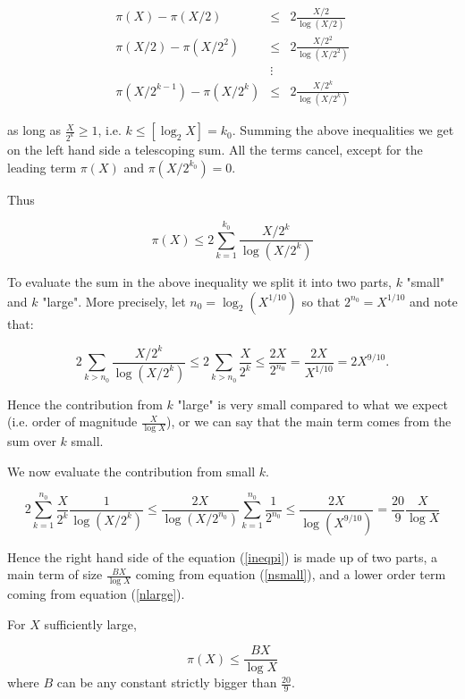 \documentclass[12pt,letterpaper]{report}
\newcommand\be{\begin{equation}}
\newcommand\ee{\end{equation}}
\newcommand\bea{\begin{eqnarray}}
\newcommand\eea{\end{eqnarray}}
\begin{document}
\bea \pi(X)-\pi(X/2) & \le & 2\frac{X/2}{\log (X/2)} \nonumber\\
\pi (X/2) - \pi(X/2^2) & \le & 2\frac{X/2^2}{\log (X/2^2)}
\nonumber\\  & \vdots & \nonumber\\  \pi(X/2^{k-1})-\pi(X/2^k) &
\le & 2\frac{X/2^k}{\log (X/2^k)} \eea

as long as $\frac{X}{2^k}\geq 1$, i.e. $k\leq [\log _2X]= k_0$.
Summing the above inequalities we get on the left hand side a
telescoping sum. All the terms cancel, except for the leading term
$\pi(X)$ and $\pi(X/2^{k_0}) = 0$.

Thus

\begin{equation}
\label{ineqpi} \pi (X)\leq 2\sum_{k=1}^{k_0}\frac{X/2^k}{\log
(X/2^k)}
\end{equation}

To evaluate the sum in the above inequality we split it into two
parts, $k$ "small" and $k$ "large". More precisely, let $n_0=\log
_2(X^{1/10})$ so that $2^{n_0} = X^{1/10}$ and note that:

\be \label{nlarge} 2\sum _{k>n_0} \frac{X/2^k}{\log (X/2^k)} \leq
2\sum_{k>n_0} \frac{X}{2^k} \le \frac{2X}{2^{n_0}}
=\frac{2X}{X^{1/10}} = 2X^{9/10}. \ee

Hence the contribution from $k$ "large" is very small compared to
what we expect (i.e. order of magnitude $\frac{X}{\log X}$), or we
can say that the main term comes from the sum over $k$ small.

We now evaluate the contribution from small $k$.

\begin{equation}\label{nsmall}
2\sum_{k=1}^{n_0}\frac{X}{2^k}\frac{1}{\log (X/2^k)} \leq
\frac{2X}{\log (X/2^{n_0})}\sum _{k=1}^{n_0}\frac{1}{2^{n_0}} \leq
\frac{2X}{\log (X^{9/10})} = \frac{20}{9}\frac{X}{\log X}
\end{equation}

 Hence the right hand side of the equation (\ref{ineqpi}) is made
 up of two parts, a main term of size $\frac{BX}{\log X}$ coming
 from equation (\ref{nsmall}), and a lower order term coming
 from equation (\ref{nlarge}).

 For $X$ sufficiently large,

 \begin{equation}
 \label{uppbdpi}
 \pi (X)\leq \frac{BX}{\log X}
 \end{equation}
 where $B$ can be any constant strictly bigger than $\frac{20}{9}$.
\end{document}
